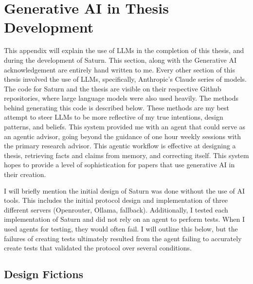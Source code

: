 \chapter{Generative AI in Thesis Development}
\label{app:ai-methodology}

This appendix will explain the use of LLMs in the completion of this thesis, and during the development of Saturn. This section, along with the Generative AI acknowledgement are entirely hand written to me. Every other section of this thesis involved the use of LLMs, specifically, Anthropic's Claude series of models. The code for Saturn and the thesis are visible on their respective Github repositories, where large language models were also used heavily. The methods behind generating this code is described below. These methods are my best attempt to steer LLMs to be more reflective of my true intentions, design patterns, and beliefs. This system provided me with an agent that could serve as an agentic advisor, going beyond the guidance of one hour weekly sessions with the primary research advisor. This agentic workflow is effective at designing a thesis, retrieving facts and claims from memory, and correcting itself. This system hopes to provide a level of sophistication for papers that use generative AI in their creation.

I will briefly mention the initial design of Saturn was done without the use of AI tools. This includes the initial protocol design and implementation of three different servers (Openrouter, Ollama, fallback). Additionally, I tested each implementation of Saturn and did not rely on an agent to perform tests. When I used agents for testing, they would often fail. I will outline this below, but the failures of creating tests ultimately resulted from the agent failing to accurately create tests that validated the protocol over several conditions.

\section{Design Fictions}

